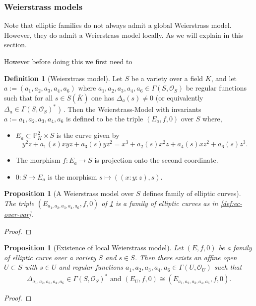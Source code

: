 \documentclass[a4paper,12pt,reqno]{amsart}
\newcommand{\field}[1]{\mathbb{#1}}  %
\renewcommand{\P}{\field{P}}
\newtheorem{proposition}[lemma]{Proposition}
\theoremstyle{definition}
\newtheorem{definition}[lemma]{Definition}
\numberwithin{lemma}{section}
\numberwithin{equation}{section}
\numberwithin{figure}{section}
\begin{document}
\subsubsection{Weierstrass models}

Note that elliptic families do not always admit a global Weierstrass model. However, they do admit a Weierstrass model locally. As we will explain in this section.

However before doing this we first need to

\begin{definition}[Weierstrass model]\label{def:weierstrass-model-over-var}
Let $S$ be a variety over a field $K$, and let $a := (a_1,a_2,a_3,a_4,a_6 )$ where $a_1,a_2,a_3,a_4,a_6 \in \Gamma(S,\mathcal O_S)$ be regular functions such that for all $s \in S(\overline K)$ one has $\Delta_{a}(s) \neq 0$ (or equivalently $\Delta_{a} \in \Gamma(S,\mathcal O_S)^*$ ) . Then the Weierstrass-Model with invariants $a:={a_1,a_2,a_3,a_4,a_6}$ is defined to be the triple $(E_{a},f,0)$ over $S$ where, \begin{itemize}[label=-]
	\item $E_{a} \subset \P^2_K \times S$ is the curve given by
	$$y^2z+ a_1(s)xyz+a_3(s)yz^2=x^3+a_2(s)x^2z+a_4(s)xz^2+a_6(s)z^3.$$
	\item The morphism $f:  E_{a} \to S$ is projection onto the second coordinate.
	\item  $0 : S \to E_{a} $  is the morphism $s \mapsto ((x:y:z),s)$.
\end{itemize}
\end{definition}

\begin{proposition}[A Weierstrass model over $S$ defines family of elliptic curves]\label{stmt:smooth-weierstrass-over-var-is-ec}
The triple $(E_{a_1,a_2,a_3,a_4,a_6},f,0)$ of \cref{def:weierstrass-model-over-var} is a family of elliptic curves as in \cref{def:ec-over-var}.
\end{proposition}
\begin{proof}
\end{proof}

\begin{proposition}[Existence of local Weierstrass model]\label{stmt:ec-over-var-has-local-weierstrass-model}
	Let $(E,f,0)$ be a family of elliptic curve over a variety $S$ and $s\in S$. Then there exists an affine open $U \subset S$ with $s \in U$ and regular functions $a_1,a_2,a_3,a_4,a_6 \in \Gamma(U,\mathcal O_U)$ such that 
	\begin{align*}
	 \Delta_{a_1,a_2,a_3,a_4,a_6} \in \Gamma(S,\mathcal O_S)^* \text{ and }
	 (E_U,f,0) \cong (E_{a_1,a_2,a_3,a_4,a_6},f,0).
	\end{align*}
\end{proposition}
\begin{proof}
\end{proof}
\end{document}
